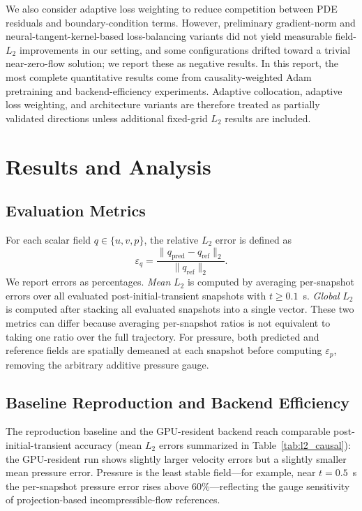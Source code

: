 \documentclass{article}
\begin{document}
We also consider adaptive loss weighting to reduce competition between PDE residuals and boundary-condition terms. However, preliminary gradient-norm and neural-tangent-kernel-based loss-balancing variants did not yield measurable field-$L_2$ improvements in our setting, and some configurations drifted toward a trivial near-zero-flow solution; we report these as negative results. In this report, the most complete quantitative results come from causality-weighted Adam pretraining and backend-efficiency experiments. Adaptive collocation, adaptive loss weighting, and architecture variants are therefore treated as partially validated directions unless additional fixed-grid $L_2$ results are included.

\section{Results and Analysis}

\subsection{Evaluation Metrics}
\label{sec:metrics}

For each scalar field $q\in\{u,v,p\}$, the relative $L_2$ error is defined as
\begin{equation}
    \varepsilon_q
    = \frac{\|q_{\mathrm{pred}} - q_{\mathrm{ref}}\|_2}
           {\|q_{\mathrm{ref}}\|_2}.
\end{equation}
We report errors as percentages. \emph{Mean} $L_2$ is computed by averaging per-snapshot errors over all evaluated post-initial-transient snapshots with $t\geq0.1$~s. \emph{Global} $L_2$ is computed after stacking all evaluated snapshots into a single vector. These two metrics can differ because averaging per-snapshot ratios is not equivalent to taking one ratio over the full trajectory. For pressure, both predicted and reference fields are spatially demeaned at each snapshot before computing $\varepsilon_p$, removing the arbitrary additive pressure gauge.

\subsection{Baseline Reproduction and Backend Efficiency}

The reproduction baseline and the GPU-resident backend reach comparable post-initial-transient accuracy (mean $L_2$ errors summarized in Table~\ref{tab:l2_causal}): the GPU-resident run shows slightly larger velocity errors but a slightly smaller mean pressure error. Pressure is the least stable field---for example, near $t=0.5$~s the per-snapshot pressure error rises above 60\%---reflecting the gauge sensitivity of projection-based incompressible-flow references.
\end{document}
